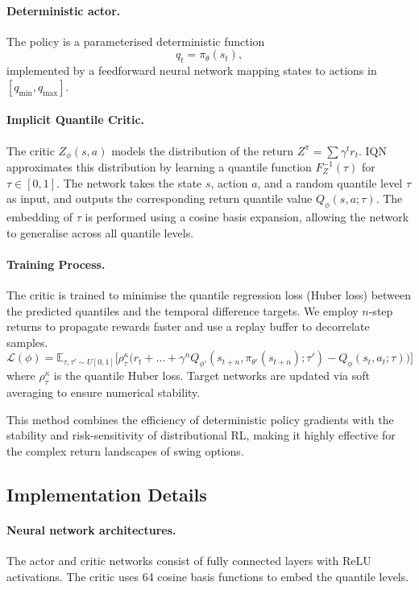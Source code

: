 \documentclass[a4paper,fleqn]{cas-dc}
\begin{document}
\paragraph{Deterministic actor.}
The policy is a parameterised deterministic function
\[
q_t = \pi_{\theta}(s_t),
\]
implemented by a feedforward neural network mapping states to actions in $[q_{\min},q_{\max}]$.

\paragraph{Implicit Quantile Critic.}
The critic $Z_\phi(s,a)$ models the distribution of the return $Z^\pi = \sum \gamma^t r_t$. IQN approximates this distribution by learning a quantile function $F_{Z}^{-1}(\tau)$ for $\tau \in [0,1]$. The network takes the state $s$, action $a$, and a random quantile level $\tau$ as input, and outputs the corresponding return quantile value $Q_\phi(s,a;\tau)$. 
The embedding of $\tau$ is performed using a cosine basis expansion, allowing the network to generalise across all quantile levels.

\paragraph{Training Process.}
The critic is trained to minimise the quantile regression loss (Huber loss) between the predicted quantiles and the temporal difference targets. We employ $n$-step returns to propagate rewards faster and use a replay buffer to decorrelate samples.
\[
\mathcal{L}(\phi) = \mathbb{E}_{\tau, \tau' \sim U[0,1]} \Big[ \rho_\tau^\kappa \big( r_t + \dots + \gamma^n Q_{\phi'}(s_{t+n}, \pi_{\theta'}(s_{t+n}); \tau') - Q_\phi(s_t, a_t; \tau) \big) \Big]
\]
where $\rho_\tau^\kappa$ is the quantile Huber loss.
Target networks are updated via soft averaging to ensure numerical stability.

This method combines the efficiency of deterministic policy gradients with the stability and risk-sensitivity of distributional RL, making it highly effective for the complex return landscapes of swing options.

\subsection{Implementation Details}

\paragraph{Neural network architectures.}
The actor and critic networks consist of fully connected layers with ReLU activations. The critic uses 64 cosine basis functions to embed the quantile levels.
\end{document}
